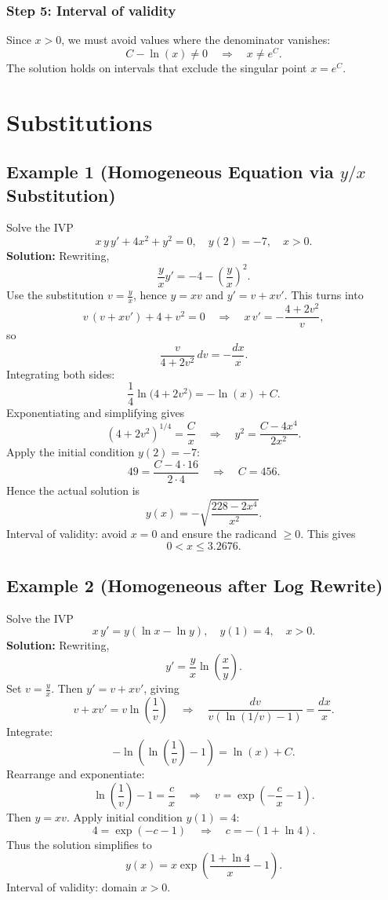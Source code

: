 \documentclass[12pt]{book}
\begin{document}
\subsubsection*{Step 5: Interval of validity}
Since \(x>0\), we must avoid values where the denominator vanishes:
\[
C - \ln(x) \neq 0 \quad\Longrightarrow\quad x \neq e^C.
\]
The solution holds on intervals that exclude the singular point \(x = e^{C}\).


\section{Substitutions}

\subsection*{Example 1 (Homogeneous Equation via \(y/x\) Substitution)}
Solve the IVP
\[
x\,y\,y' + 4x^2 + y^2 = 0,\quad y(2) = -7,\quad x > 0.
\]
\textbf{Solution:}
Rewriting,
\[
\frac{y}{x}y' = -4 - \left(\frac{y}{x}\right)^2.
\]
Use the substitution \(v = \tfrac{y}{x}\), hence \(y = xv\) and \(y' = v + x v'\). This turns into
\[
v\,(v + x v') + 4 + v^2 = 0 \quad\Longrightarrow\quad x\,v' = -\frac{4 + 2v^2}{v},
\]
so
\[
\frac{v}{4 + 2v^2}\,dv = -\frac{dx}{x}.
\]
Integrating both sides:
\[
\frac{1}{4}\ln\!\bigl(4 + 2v^2\bigr) = -\ln(x) + C.
\]
Exponentiating and simplifying gives
\[
(4 + 2v^2)^{1/4} = \frac{C}{x}
\quad\Longrightarrow\quad
y^2 = \frac{C - 4x^4}{2x^2}.
\]
Apply the initial condition \(y(2) = -7\):
\[
49 = \frac{C - 4\cdot16}{2\cdot4}
\quad\Longrightarrow\quad
C = 456.
\]
Hence the actual solution is
\[
y(x) = -\sqrt{\frac{228 - 2x^4}{x^2}}.
\]
Interval of validity: avoid \(x=0\) and ensure the radicand \(\geq 0\). This gives
\[
0 < x \le 3.2676.
\]

\subsection*{Example 2 (Homogeneous after Log Rewrite)}
Solve the IVP
\[
x\,y' = y\left(\ln x - \ln y\right),\quad y(1) = 4,\quad x > 0.
\]
\textbf{Solution:}
Rewriting,
\[
y' = \frac{y}{x}\ln\!\left(\frac{x}{y}\right).
\]
Set \(v = \tfrac{y}{x}\). Then \(y' = v + x v'\), giving
\[
v + x v' = v\ln\left(\frac{1}{v}\right)
\quad\Longrightarrow\quad
\frac{dv}{v\left(\ln(1/v) - 1\right)} = \frac{dx}{x}.
\]
Integrate:
\[
- \ln\left(\ln\left(\frac{1}{v}\right) - 1\right) = \ln(x) + C.
\]
Rearrange and exponentiate:
\[
\ln\left(\frac{1}{v}\right) - 1 = \frac{c}{x} \quad\Longrightarrow\quad
v = \exp\left(-\frac{c}{x} - 1\right).
\]
Then \(y = xv\). Apply initial condition \(y(1)=4\):
\[
4 = \exp\left(-c - 1\right)
\quad\Longrightarrow\quad
c = -(1 + \ln4).
\]
Thus the solution simplifies to
\[
y(x) = x \exp\left(\frac{1 + \ln4}{x} - 1\right).
\]
Interval of validity: domain \(x>0\).
\end{document}
